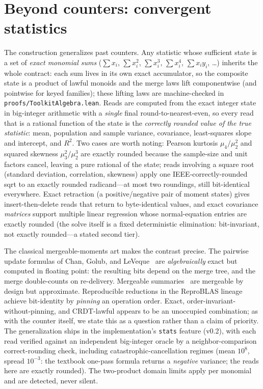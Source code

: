 \documentclass[11pt]{article}
\begin{document}
\section{Beyond counters: convergent statistics}
\label{sec:stats}

The construction generalizes past counters. Any statistic whose sufficient state is a set of
\emph{exact monomial sums} ($\sum x_i$, $\sum x_i^2$, $\sum x_i^3$, $\sum x_i^4$, $\sum x_i y_i$, \dots)
inherits the whole contract: each sum lives in its own exact accumulator, so the composite state is a
product of lawful monoids and the merge laws lift componentwise (and pointwise for keyed families);
these lifting laws are machine-checked in \texttt{proofs/ToolkitAlgebra.lean}. Reads are computed from
the exact integer state in big-integer arithmetic with a \emph{single} final round-to-nearest-even, so
every read that is a rational function of the state is the \emph{correctly rounded value of the true
statistic}: mean, population and sample variance, covariance, least-squares slope and intercept, and
$R^2$. Two cases are worth noting: Pearson kurtosis $\mu_4/\mu_2^2$ and squared skewness
$\mu_3^2/\mu_2^3$ are exactly rounded because the sample-size and unit factors cancel, leaving a pure
rational of the state; reads involving a square root (standard deviation, correlation, skewness) apply
one IEEE-correctly-rounded \textsf{sqrt} to an exactly rounded radicand---at most two roundings, still
bit-identical everywhere. Exact retraction (a positive/negative pair of moment states) gives
insert-then-delete reads that return to byte-identical values, and exact covariance \emph{matrices}
support multiple linear regression whose normal-equation entries are exactly rounded (the solve itself
is a fixed deterministic elimination: bit-invariant, not exactly rounded---a stated second tier).

The classical mergeable-moments art makes the contrast precise. The pairwise update formulas of Chan,
Golub, and LeVeque~\cite{chan} are \emph{algebraically} exact but computed in floating point: the
resulting bits depend on the merge tree, and the merge double-counts on re-delivery. Mergeable
summaries~\cite{agarwal} are mergeable by design but approximate. Reproducible reductions in the
ReproBLAS lineage achieve bit-identity by \emph{pinning} an operation order. Exact,
order-invariant-without-pinning, and CRDT-lawful appears to be an unoccupied combination; as with the
counter itself, we state this as a question rather than a claim of priority. The generalization
ships in the implementation's \texttt{stats} feature (v0.2), with each read verified against an
independent big-integer oracle by a neighbor-comparison correct-rounding check, including
catastrophic-cancellation regimes (mean $10^8$, spread $10^{-3}$: the textbook one-pass formula returns
a \emph{negative} variance; the reads here are exactly rounded). The two-product domain limits apply per
monomial and are detected, never silent.
\end{document}
